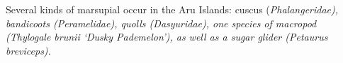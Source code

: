 Several kinds of marsupial occur in the Aru Islands: cuscus (\it{Phalangeridae}),
bandicoots (\it{Peramelidae}), quolls (\it{Dasyuridae}),
one species of macropod (\it{Thylogale brunii} ‘Dusky Pademelon’),
as well as a sugar glider (\it{Petaurus breviceps}).